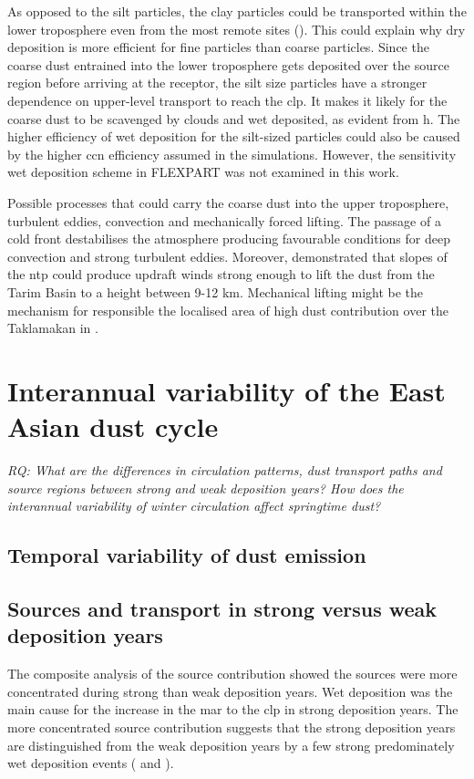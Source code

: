 As opposed to the silt particles, the clay particles could be transported within the lower troposphere even from the most remote sites (). 
This could explain why dry deposition is more efficient for fine particles than coarse particles. Since the coarse dust entrained into the lower troposphere gets deposited over the source region before arriving at the receptor, the silt size particles have a stronger dependence on upper-level transport to reach the \acrshort{clp}. 
It makes it likely for the coarse dust to be scavenged by clouds and wet deposited, as evident from h. The higher efficiency of wet deposition for the silt-sized particles could also be caused by the higher \acrshort{ccn} efficiency assumed in the simulations. However, the sensitivity wet deposition scheme in FLEXPART was not examined in this work.  

Possible processes that could carry the coarse dust into the upper troposphere, turbulent eddies, convection and mechanically forced lifting. 
The passage of a cold front destabilises the atmosphere producing favourable conditions for deep convection and strong turbulent eddies.    
Moreover, \textcite{yumimoto_elevated_2009} demonstrated that slopes of the \acrfull{ntp} could produce updraft winds strong enough to lift the dust from the Tarim Basin to a height between 9-12 km. Mechanical lifting might be the mechanism for responsible the localised area of high dust contribution over the Taklamakan in .    

\section{Interannual variability of the East Asian dust cycle}
\emph{RQ: What are the differences in circulation patterns, dust transport paths and source regions between strong and weak deposition years? How does the interannual variability of winter circulation affect springtime dust?}
\subsection{Temporal variability of dust emission}

\subsection{Sources and transport in strong versus weak deposition years}
The composite analysis of the source contribution showed the sources  were more concentrated during strong than weak deposition years. 
Wet deposition was the main cause for the increase in the \acrshort{mar} to the \acrshort{clp} in strong deposition years. The more concentrated source contribution suggests that the strong deposition years are distinguished from the weak deposition years by a few strong predominately wet deposition events ( and ). 

